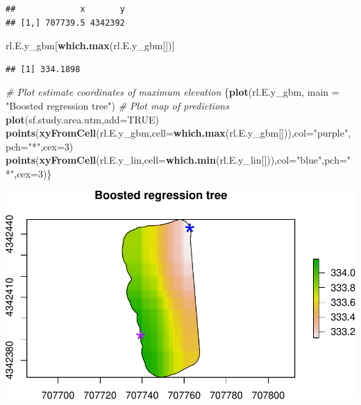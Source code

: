 \documentclass[
]{book}
\newenvironment{Shaded}{\begin{snugshade}}{\end{snugshade}}
\newcommand{\AttributeTok}[1]{\textcolor[rgb]{0.13,0.29,0.53}{#1}}
\newcommand{\CommentTok}[1]{\textcolor[rgb]{0.56,0.35,0.01}{\textit{#1}}}
\newcommand{\ConstantTok}[1]{\textcolor[rgb]{0.56,0.35,0.01}{#1}}
\newcommand{\DecValTok}[1]{\textcolor[rgb]{0.00,0.00,0.81}{#1}}
\newcommand{\FunctionTok}[1]{\textcolor[rgb]{0.13,0.29,0.53}{\textbf{#1}}}
\newcommand{\NormalTok}[1]{#1}
\newcommand{\StringTok}[1]{\textcolor[rgb]{0.31,0.60,0.02}{#1}}
\begin{document}
\begin{verbatim}
##             x       y
## [1,] 707739.5 4342392
\end{verbatim}

\begin{Shaded}
\begin{Highlighting}[]
\NormalTok{rl.E.y\_gbm[}\FunctionTok{which.max}\NormalTok{(rl.E.y\_gbm[])]}
\end{Highlighting}
\end{Shaded}

\begin{verbatim}
## [1] 334.1898
\end{verbatim}

\begin{Shaded}
\begin{Highlighting}[]
\CommentTok{\# Plot estimate coordinates of maximum elevation}
\NormalTok{\{}\FunctionTok{plot}\NormalTok{(rl.E.y\_gbm, }\AttributeTok{main =} \StringTok{"Boosted regression tree"}\NormalTok{) }\CommentTok{\# Plot map of predictions}
\FunctionTok{plot}\NormalTok{(sf.study.area.utm,}\AttributeTok{add=}\ConstantTok{TRUE}\NormalTok{)}
\FunctionTok{points}\NormalTok{(}\FunctionTok{xyFromCell}\NormalTok{(rl.E.y\_gbm,}\AttributeTok{cell=}\FunctionTok{which.max}\NormalTok{(rl.E.y\_gbm[])),}\AttributeTok{col=}\StringTok{"purple"}\NormalTok{,}\AttributeTok{pch=}\StringTok{"*"}\NormalTok{,}\AttributeTok{cex=}\DecValTok{3}\NormalTok{)}
\FunctionTok{points}\NormalTok{(}\FunctionTok{xyFromCell}\NormalTok{(rl.E.y\_lin,}\AttributeTok{cell=}\FunctionTok{which.min}\NormalTok{(rl.E.y\_lin[])),}\AttributeTok{col=}\StringTok{"blue"}\NormalTok{,}\AttributeTok{pch=}\StringTok{"*"}\NormalTok{,}\AttributeTok{cex=}\DecValTok{3}\NormalTok{)\}}
\end{Highlighting}
\end{Shaded}

\includegraphics{_main_files/figure-latex/unnamed-chunk-22-1.pdf}
\end{document}
